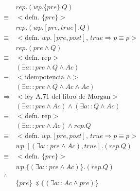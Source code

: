 \documentclass{article}
\begin{document}
\begin{align*}
 & rep.(wp.\{pre\}.Q) \\
 \equiv & <\text{defn. } \{pre\}> \\
 & rep.(wp.[pre,true].Q) \\
 \equiv & <\text{defn. } wp.[pre,post] \text{, } true \Rightarrow p \equiv p> \\
 & rep.(pre \wedge Q) \\
 \equiv & <\text{defn. rep}> \\
 & (\exists a :: pre \wedge Q \wedge Ac) \\
 \equiv & <\text{idempotencia } \wedge> \\
 & (\exists a :: pre \wedge Q \wedge Ac \wedge Ac) \\
 \Rightarrow & <\text{ley A.71 del libro de Morgan}> \\
 & (\exists a :: pre \wedge Ac) \wedge (\exists a :: Q \wedge Ac) \\
 \equiv & <\text{defn. rep}> \\
 & (\exists a :: pre \wedge Ac) \wedge rep.Q \\
 \equiv & <\text{defn. } wp.[pre,post] \text{, } true \Rightarrow p \equiv p> \\
 & wp.[(\exists a :: pre \wedge Ac),true].(rep.Q) \\
 \equiv & <\text{defn. } \{pre\}> \\
 & wp.\{(\exists a :: pre \wedge Ac)\}.(rep.Q) \\
 \therefore & \\
 & \{pre\} \preccurlyeq \{(\exists a :: Ac \wedge pre)\}
\end{align*}
\end{document}
